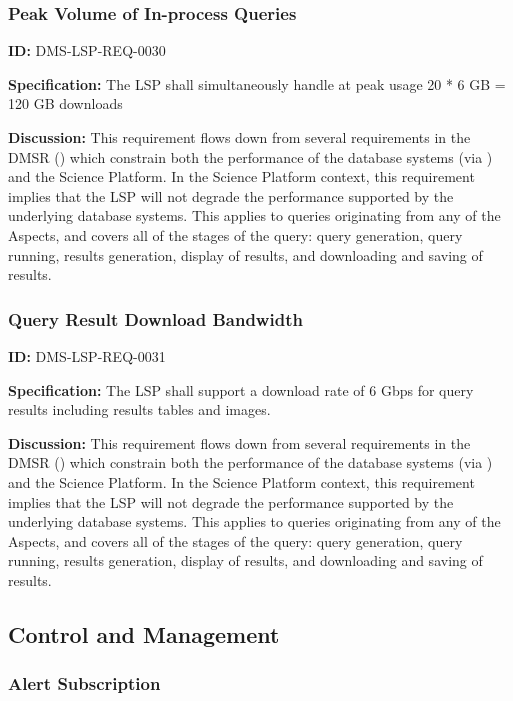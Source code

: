 \documentclass[SE,toc]{lsstdoc}
\begin{document}
\subsubsection{Peak Volume of In-process Queries}

\label{DMS-LSP-REQ-0030}
\textbf{ID:} DMS-LSP-REQ-0030

\textbf{Specification:}
The LSP shall simultaneously handle at peak usage 20 * 6 GB = 120 GB downloads

\textbf{Discussion:}
This requirement flows down from several requirements in the DMSR () which constrain both the performance of the database systems (via ) and the Science Platform.  In the Science Platform context, this requirement implies that the LSP will not degrade the performance supported by the underlying database systems.  This applies to queries originating from any of the Aspects, and covers all of the stages of the query: query generation, query running, results generation, display of results, and downloading and saving of results.

\subsubsection{Query Result Download Bandwidth}

\label{DMS-LSP-REQ-0031}
\textbf{ID:} DMS-LSP-REQ-0031

\textbf{Specification:}
The LSP shall support a download rate of 6 Gbps for query results including results tables and images.

\textbf{Discussion:}
This requirement flows down from several requirements in the DMSR () which constrain both the performance of the database systems (via ) and the Science Platform.  In the Science Platform context, this requirement implies that the LSP will not degrade the performance supported by the underlying database systems.  This applies to queries originating from any of the Aspects, and covers all of the stages of the query: query generation, query running, results generation, display of results, and downloading and saving of results.

\subsection{Control and Management}

\subsubsection{Alert Subscription}
\end{document}
